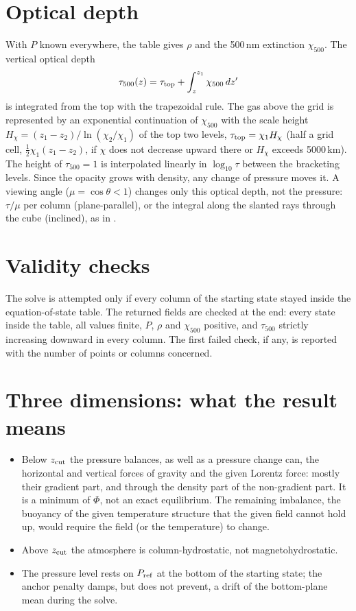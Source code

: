 \section{Optical depth}\label{sec:tau}
With $P$ known everywhere, the table gives $\rho$ and the 500\,nm extinction $\chi_{500}$. The vertical optical depth
\begin{equation}
\tau_{500}(z)=\tau_{\rm top}+\int_z^{z_1}\chi_{500}\,dz'
\end{equation}
is integrated from the top with the trapezoidal rule. The gas above the grid is represented by an exponential continuation of
$\chi_{500}$ with the scale height $H_\chi=(z_1-z_2)/\ln(\chi_2/\chi_1)$ of the top two levels, $\tau_{\rm top}=\chi_1H_\chi$
(half a grid cell, $\tfrac12\chi_1(z_1-z_2)$, if $\chi$ does not decrease upward there or $H_\chi$ exceeds 5000\,km). The height
of $\tau_{500}=1$ is interpolated linearly in $\log_{10}\tau$ between the bracketing levels. Since the opacity grows with
density, any change of pressure moves it. A viewing angle ($\mu=\cos\theta<1$) changes only this optical depth, not the pressure: $\tau/\mu$ per column
(plane-parallel), or the integral along the slanted rays through the cube (inclined), as in .

\section{Validity checks}
The solve is attempted only if every column of the starting state stayed inside the equation-of-state table. The returned
fields are checked at the end: every state inside the table, all values finite, $P$, $\rho$ and $\chi_{500}$ positive, and
$\tau_{500}$ strictly increasing downward in every column. The first failed check, if any, is reported with the number of
points or columns concerned.

\section{Three dimensions: what the result means}
\begin{itemize}
\item Below $z_{\rm cut}$ the pressure balances, as well as a pressure change can, the horizontal and vertical forces of
gravity and the given Lorentz force: mostly their gradient part, and through the density part of the non-gradient part.
It is a minimum of $\Phi$, not an exact equilibrium. The remaining imbalance, the buoyancy of the given temperature
structure that the given field cannot hold up, would require the field (or the temperature) to change.
\item Above $z_{\rm cut}$ the atmosphere is column-hydrostatic, not magnetohydrostatic.
\item The pressure level rests on $P_{\rm ref}$ at the bottom of the starting state; the anchor penalty damps, but does not
prevent, a drift of the bottom-plane mean during the solve.
\end{itemize}

